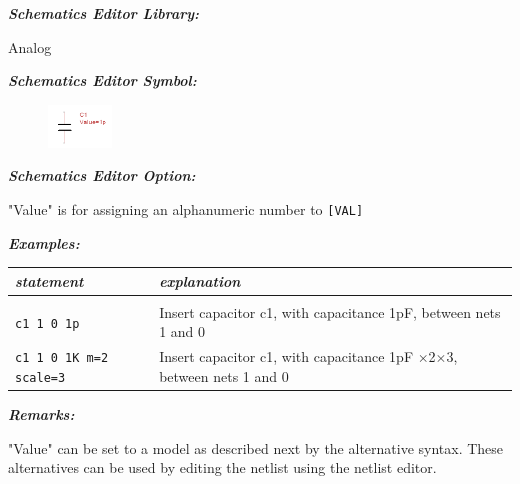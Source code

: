 
\textbf{\textit{Schematics Editor Library:}}

Analog

\textbf{\textit{Schematics Editor Symbol:}}

\begin{figure}[htb]
  \begin{center}
    \includegraphics[width=0.15\textwidth]{./pics/SpiceEl/Capacitor.png}
  \end{center}
\end{figure}

\textbf{\textit{Schematics Editor Option:}}

"\textsf{Value}" is for assigning an alphanumeric number to \texttt{[VAL]}

\textbf{\textit{Examples:}}

\begin{longtable}{l l}
\textit{statement} & \textit{explanation} \\ \hline \\ \vspace{-0.8\parskip} 
\texttt{c1 1 0 1p} & {\small Insert capacitor c1, with capacitance 1pF, between nets 1 and 0} \\
\texttt{c1 1 0 1K m=2 scale=3} & {\small Insert capacitor c1, with capacitance 1pF $\times$2$\times$3, between nets 1 and 0}
\end{longtable}

\textbf{\textit{Remarks:}}

"\textsf{Value}" can be set to a model as described next by the alternative syntax. These alternatives can be used by editing the netlist using the netlist editor.






